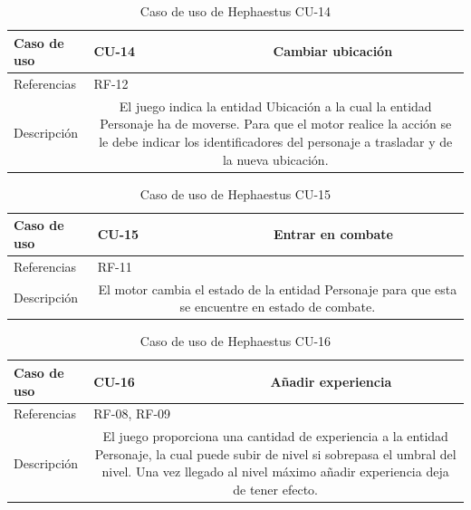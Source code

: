\begin{table}[H]
	\centering
	\small
	\begin{tabularx}{\linewidth}{|l|cc|}
		\hline
		{\cellcolor[HTML]{C0C0C0} Caso de uso} & \multicolumn{1}{l|}{CU-14} & Cambiar ubicación \\ \hline
		{\cellcolor[HTML]{C0C0C0} Referencias} & \multicolumn{2}{l|}{RF-12} \\ \hline
		{\cellcolor[HTML]{C0C0C0} Descripción} & \multicolumn{2}{X|}{El juego indica la entidad Ubicación a la cual la entidad Personaje ha de moverse. Para que el motor realice la acción se le debe indicar los identificadores del personaje a trasladar y de la nueva ubicación.} \\ \hline
	\end{tabularx}
	
	\vspace{0.5cm}
	\caption{Caso de uso de Hephaestus CU-14}
	\label{tab:hephaestus-cu-14}
\end{table}

\begin{table}[H]
	\centering
	\small
	\begin{tabularx}{\linewidth}{|l|cc|}
		\hline
		{\cellcolor[HTML]{C0C0C0} Caso de uso} & \multicolumn{1}{l|}{CU-15} & Entrar en combate \\ \hline
		{\cellcolor[HTML]{C0C0C0} Referencias} & \multicolumn{2}{l|}{RF-11} \\ \hline
		{\cellcolor[HTML]{C0C0C0} Descripción} & \multicolumn{2}{X|}{El motor cambia el estado de la entidad Personaje para que esta se encuentre en estado de combate.} \\ \hline
	\end{tabularx}
	
	\vspace{0.5cm}
	\caption{Caso de uso de Hephaestus CU-15}
	\label{tab:hephaestus-cu-15}
\end{table}

\begin{table}[H]
	\centering
	\small
	\begin{tabularx}{\linewidth}{|l|cc|}
		\hline
		{\cellcolor[HTML]{C0C0C0} Caso de uso} & \multicolumn{1}{l|}{CU-16} & Añadir experiencia \\ \hline
		{\cellcolor[HTML]{C0C0C0} Referencias} & \multicolumn{2}{l|}{RF-08, RF-09} \\ \hline
		{\cellcolor[HTML]{C0C0C0} Descripción} & \multicolumn{2}{X|}{El juego proporciona una cantidad de experiencia a la entidad Personaje, la cual puede subir de nivel si sobrepasa el umbral del nivel. Una vez llegado al nivel máximo añadir experiencia deja de tener efecto.} \\ \hline
	\end{tabularx}
	
	\vspace{0.5cm}
	\caption{Caso de uso de Hephaestus CU-16}
	\label{tab:hephaestus-cu-16}
\end{table}

